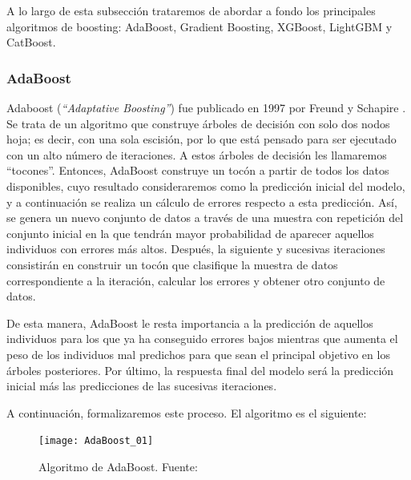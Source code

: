 \documentclass[12pt,twoside]{article}
\begin{document}
A lo largo de esta subsección trataremos de abordar a fondo los principales algoritmos de boosting: AdaBoost, Gradient Boosting, XGBoost, LightGBM y CatBoost.


\subsubsection{AdaBoost} \label{sec:AdaBoost}
Adaboost (\textit{``Adaptative Boosting''}) fue publicado en 1997 por Freund y Schapire \cite{FR01}. Se trata de un algoritmo que construye árboles de decisión con solo dos nodos hoja; es decir, con una sola escisión, por lo que está pensado para ser ejecutado con un alto número de iteraciones. A estos árboles de decisión les llamaremos ``tocones''. Entonces, AdaBoost construye un tocón a partir de todos los datos disponibles, cuyo resultado consideraremos como la predicción inicial del modelo, y a continuación se realiza un cálculo de errores respecto a esta predicción. Así, se genera un nuevo conjunto de datos a través de una muestra con repetición del conjunto inicial en la que tendrán mayor probabilidad de aparecer aquellos individuos con errores más altos. Después, la siguiente y sucesivas iteraciones consistirán en construir un tocón que clasifique la muestra de datos correspondiente a la iteración, calcular los errores y obtener otro conjunto de datos.

De esta manera, AdaBoost le resta importancia a la predicción de aquellos individuos para los que ya ha conseguido errores bajos mientras que aumenta el peso de los individuos mal predichos para que sean el principal objetivo en los árboles posteriores. Por último, la respuesta final del modelo será la predicción inicial más las predicciones de las sucesivas iteraciones. 


A continuación, formalizaremos este proceso. El algoritmo es el siguiente:
\begin{figure}[h]
\centering
\texttt{[image: AdaBoost\_01]}
\caption{Algoritmo de AdaBoost. Fuente: \cite{FR04}}
\label{fig: AdaBoost_01}
\end{figure}
\end{document}
